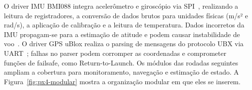 O driver IMU BMI088 integra acelerômetro e
giroscópio via SPI~\cite{PX4_Documentation}, realizando a leitura de
registradores, a conversão de dados brutos para unidades físicas (m/s² e rad/s),
 a aplicação de calibração e a leitura de temperatura. Dados incorretos da IMU
propagam-se para a estimação de atitude e podem causar instabilidade de
voo~\cite{Siddiqi2022}. O driver GPS uBlox realiza o parsing de mensagens do
protocolo UBX via UART~\cite{PX4_Documentation}; falhas no parser podem
corromper as coordenadas e comprometer funções de failsafe, como Return-to-Launch.
Os módulos das rodadas seguintes ampliam a
cobertura para monitoramento, navegação e estimação de estado. A
Figura~\ref{fig:px4-modular} mostra a organização modular em que eles se
inserem.

